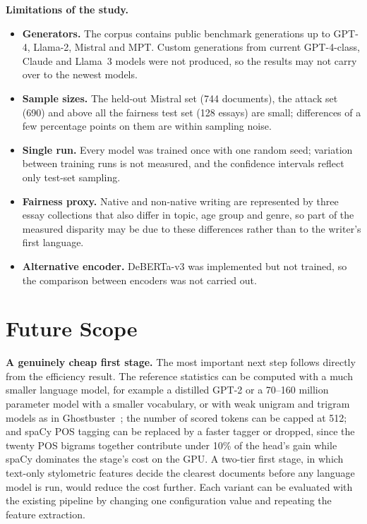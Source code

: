 \textbf{Limitations of the study.}
\begin{itemize}
  \item \textbf{Generators.} The corpus contains public benchmark generations
        up to GPT-4, Llama-2, Mistral and MPT. Custom generations from current
        GPT-4-class, Claude and Llama~3 models were not produced, so the results
        may not carry over to the newest models.
  \item \textbf{Sample sizes.} The held-out Mistral set (744 documents), the
        attack set (690) and above all the fairness test set (128 essays) are
        small; differences of a few percentage points on them are within
        sampling noise.
  \item \textbf{Single run.} Every model was trained once with one random seed;
        variation between training runs is not measured, and the confidence
        intervals reflect only test-set sampling.
  \item \textbf{Fairness proxy.} Native and non-native writing are represented by
        three essay collections that also differ in topic, age group and
        genre, so part of the measured disparity may be due to these
        differences rather than to the writer's first language.
  \item \textbf{Alternative encoder.} DeBERTa-v3 was implemented but not
        trained, so the comparison between encoders was not carried out.
\end{itemize}

\section{Future Scope}
\label{sec:future}

\textbf{A genuinely cheap first stage.} The most important next step follows
directly from the efficiency result. The reference statistics can be computed
with a much smaller language model, for example a distilled GPT-2 or a
70--160 million parameter model with a smaller vocabulary, or with weak
unigram and trigram models as in Ghostbuster~\cite{verma2024ghostbuster}; the
number of scored tokens can be capped at 512; and spaCy POS tagging can be
replaced by a faster tagger or dropped, since the twenty POS bigrams together
contribute under 10\% of the head's gain while spaCy dominates the stage's cost
on the GPU. A two-tier first stage, in which text-only stylometric
features decide the clearest documents before any language model is run, would
reduce the cost further. Each variant can be evaluated with the existing
pipeline by changing one configuration value and repeating the feature
extraction.

